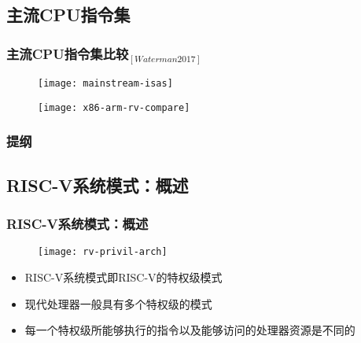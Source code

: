\subsection{主流CPU指令集}
\begin{frame}
	
	\frametitle{{主流CPU指令集比较$ _{[Waterman 2017]} $}}
	
	\begin{figure}
		\centering
		\texttt{[image: mainstream-isas]}
	\end{figure}
	\pause
	
	\begin{figure}
		\centering
		\texttt{[image: x86-arm-rv-compare]}
	\end{figure}
	
	
	
	
\end{frame}

\begin{frame}
    \frametitle{提纲} 
    \tableofcontents 
\end{frame}

\subsection{RISC-V系统模式：概述}
\begin{frame}
    \frametitle{RISC-V系统模式：概述}
    
    \begin{figure}
        \centering
        \texttt{[image: rv-privil-arch]}
    \end{figure}
    
    \begin{itemize}
        
        \item RISC-V系统模式即RISC-V的特权级模式
        \item 现代处理器一般具有多个特权级的模式
        \item 每一个特权级所能够执行的指令以及能够访问的处理器资源是不同的
        
    \end{itemize}
    
\end{frame}


